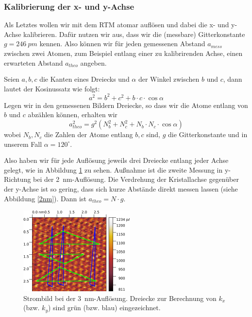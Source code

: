 \subsubsection{Kalibrierung der x- und y-Achse}

Als Letztes wollen wir mit dem RTM atomar auflösen und dabei die x- und y-Achse kalibrieren. Dafür nutzen wir aus, dass wir die (messbare) Gitterkonstante $g = \SI{246}{pm}$ kennen. Also können wir für jeden gemessenen Abstand $a_{mess}$ zwischen zwei Atomen, zum Beispiel entlang einer zu kalibrirenden Achse, einen erwarteten Abstand $a_{theo}$ angeben.

Seien $a, b, c$ die Kanten eines Dreiecks und $\alpha$ der Winkel zwischen $b$ und $c$, dann lautet der Kosinussatz wie folgt:
\begin{equation}
a^2 = b^2 + c^2 + b \cdot c \cdot \cos\alpha
\end{equation}
Legen wir in den gemessenen Bildern Dreiecke, so dass wir die Atome entlang von $b$ und $c$ abzählen können, erhalten wir
\begin{equation}
a_{theo}^2 = g^2 (N_b^2 + N_c^2 + N_b \cdot N_c \cdot \cos\alpha)
\end{equation}
wobei $N_b, N_c$ die Zahlen der Atome entlang $b, c$ sind, $g$ die Gitterkonstante und in unserem Fall $\alpha = 120^{\circ}$.

Also haben wir für jede Auflösung jeweils drei Dreiecke entlang jeder Achse gelegt, wie in Abbildung \ref{3nm} zu sehen. Außnahme ist die zweite Messung in y-Richtung bei der \SI{2}{nm}-Auflösung. Die Verdrehung der Kristallachse gegenüber der y-Achse ist so gering, dass sich kurze Abstände direkt messen lassen (siehe Abbildung \ref{2nm}). Dann ist $a_{theo} = N \cdot g$.

\begin{figure}[H]
\centering
\includegraphics[width=\textwidth]{../Gwyddion/HOPG/3nm_gimped.pdf}
\caption{Strombild bei der \SI{3}{nm}-Auflösung. Dreiecke zur Berechnung von $k_x$ (bzw. $k_y$) sind grün (bzw. blau) eingezeichnet.}
\label{3nm}
\end{figure}

